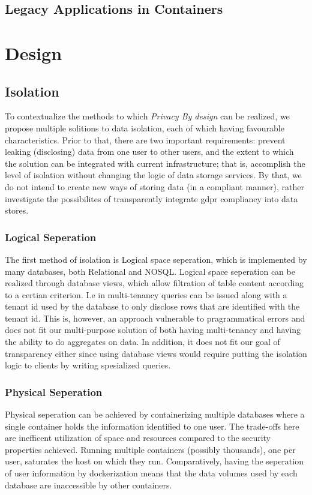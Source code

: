 \documentclass[USenglish]{uit-thesis}
\begin{document}
\section{Legacy Applications in Containers}


\chapter{Design}
\section{Isolation}
To contextualize the methods to which \textit{Privacy By design} can be realized, we
propose multiple solitions to data isolation, each of which having favourable characteristics.
Prior to that, there are two important requirements: prevent leaking (disclosing) data
from one user to other users, and the extent to which the solution can be
integrated with current infrastructure; that is, accomplish the level of isolation
without changing the logic of data storage services.
By that, we do not intend to create new ways of storing data (in a compliant manner),
rather investigate the possibilites of transparently integrate \gls{gdpr} compliancy
into data stores.

\subsection{Logical Seperation}
The first method of isolation is Logical space seperation, which is implemented
by many databases, both Relational and NOSQL.
Logical space seperation can be realized through database views, which
allow filtration of table content according to a certian criterion.
I.e in multi-tenancy queries can be issued along with a tenant id used by the database
to only disclose rows that are identified with the tenant id.
This is, however, an approach vulnerable to pragrammatical errors and does not fit our
multi-purpose solution of both having multi-tenancy and having the ability to do aggregates
on data.
In addition, it does not fit our goal of transparency either since using
database views would require putting the isolation logic to clients by writing spesialized
queries.

\subsection{Physical Seperation}
Physical seperation can be achieved by containerizing multiple databases where
a single container holds the information identified to one user.
The trade-offs here are inefficent utilization of space and resources compared to
the security properties achieved.
Running multiple containers (possibly thousands), one per user, saturates
the host on which they run.
Comparatively, having the seperation of user information by dockerization means
that the data volumes used by each database are inaccessible by other containers.
\end{document}
